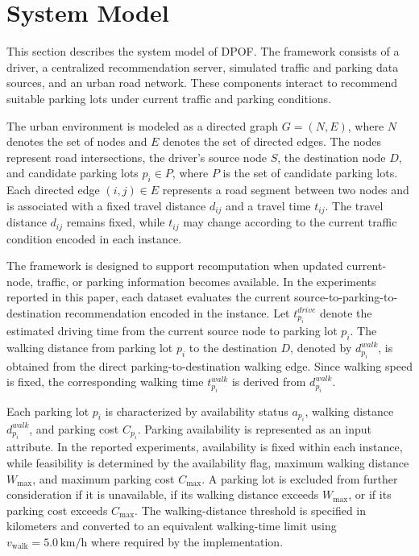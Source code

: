 \section{System Model}

This section describes the system model of DPOF. The framework consists of a driver, a centralized recommendation server, simulated traffic and parking data sources, and an urban road network. These components interact to recommend suitable parking lots under current traffic and parking conditions.

The urban environment is modeled as a directed graph \(G=(N,E)\), where \(N\) denotes the set of nodes and \(E\) denotes the set of directed edges. The nodes represent road intersections, the driver's source node \(S\), the destination node \(D\), and candidate parking lots \(p_i \in P\), where \(P\) is the set of candidate parking lots. Each directed edge \((i,j)\in E\) represents a road segment between two nodes and is associated with a fixed travel distance \(d_{ij}\) and a travel time \(t_{ij}\). The travel distance \(d_{ij}\) remains fixed, while \(t_{ij}\) may change according to the current traffic condition encoded in each instance.

The framework is designed to support recomputation when updated current-node, traffic, or parking information becomes available. In the experiments reported in this paper, each dataset evaluates the current source-to-parking-to-destination recommendation encoded in the instance. Let \(t^{drive}_{p_i}\) denote the estimated driving time from the current source node to parking lot \(p_i\). The walking distance from parking lot \(p_i\) to the destination \(D\), denoted by \(d^{walk}_{p_i}\), is obtained from the direct parking-to-destination walking edge. Since walking speed is fixed, the corresponding walking time \(t^{walk}_{p_i}\) is derived from \(d^{walk}_{p_i}\).

Each parking lot \(p_i\) is characterized by availability status \(a_{p_i}\), walking distance \(d^{walk}_{p_i}\), and parking cost \(C_{p_i}\). Parking availability is represented as an input attribute. In the reported experiments, availability is fixed within each instance, while feasibility is determined by the availability flag, maximum walking distance \(W_{\max}\), and maximum parking cost \(C_{\max}\). A parking lot is excluded from further consideration if it is unavailable, if its walking distance exceeds \(W_{\max}\), or if its parking cost exceeds \(C_{\max}\). The walking-distance threshold is specified in kilometers and converted to an equivalent walking-time limit using \(v_{\mathrm{walk}}=5.0\,\mathrm{km/h}\) where required by the implementation.

